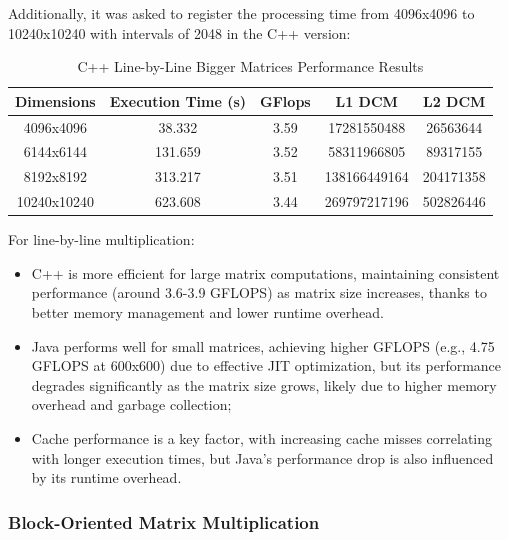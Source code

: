 \documentclass{article}
\begin{document}
Additionally, it was asked to register the processing time from 4096x4096 to 10240x10240 with intervals of 2048 in the C++ version:

\begin{table}[H]
\centering
\caption{C++ Line-by-Line Bigger Matrices Performance Results}
\begin{tabular}{||c | c | c | c | c||} 
 \hline
 \textbf{Dimensions} & \textbf{Execution Time (s)} & \textbf{GFlops} & \textbf{L1 DCM} & \textbf{L2 DCM} \\  
 \hline \hline
 4096x4096  & 38.332   & 3.59   & 17281550488   & 26563644    \\  
 \hline
 6144x6144  & 131.659  & 3.52   & 58311966805   & 89317155    \\  
 \hline
 8192x8192  & 313.217  & 3.51   & 138166449164  & 204171358   \\  
 \hline
 10240x10240 & 623.608  & 3.44   & 269797217196  & 502826446   \\  
 \hline
\end{tabular}
\end{table}

For line-by-line multiplication:

\begin{itemize}
    \item C++ is more efficient for large matrix computations, maintaining consistent performance (around 3.6-3.9 GFLOPS) as matrix size increases, thanks to better memory management and lower runtime overhead.
    \item Java performs well for small matrices, achieving higher GFLOPS (e.g., 4.75 GFLOPS at 600x600) due to effective JIT optimization, but its performance degrades significantly as the matrix size grows, likely due to higher memory overhead and garbage collection;
    \item Cache performance is a key factor, with increasing cache misses correlating with longer execution times, but Java's performance drop is also influenced by its runtime overhead.
\end{itemize}

\subsubsection{Block-Oriented Matrix Multiplication}
\end{document}
